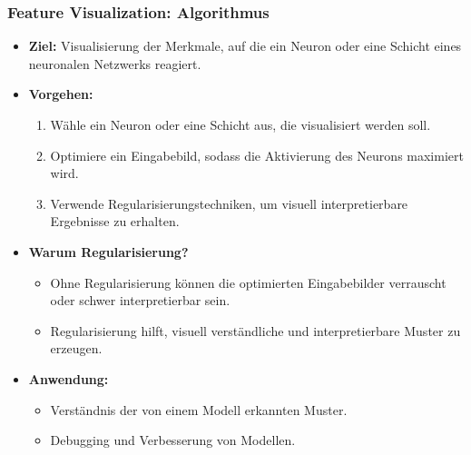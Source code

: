 \documentclass[aspectratio=1610, xcolor=dvipsnames, 9pt]{beamer}
\begin{document}
\begin{frame}
  \frametitle{Feature Visualization: Algorithmus}
  \begin{itemize}
    \item \textbf{Ziel:} Visualisierung der Merkmale, auf die ein Neuron oder eine Schicht eines neuronalen Netzwerks reagiert.
    \item \textbf{Vorgehen:}
    \begin{enumerate}
      \item Wähle ein Neuron oder eine Schicht aus, die visualisiert werden soll.
      \item Optimiere ein Eingabebild, sodass die Aktivierung des Neurons maximiert wird.
      \item Verwende Regularisierungstechniken, um visuell interpretierbare Ergebnisse zu erhalten.
    \end{enumerate}
    \item \textbf{Warum Regularisierung?}
    \begin{itemize}
      \item Ohne Regularisierung können die optimierten Eingabebilder verrauscht oder schwer interpretierbar sein.
      \item Regularisierung hilft, visuell verständliche und interpretierbare Muster zu erzeugen.
    \end{itemize}
    \item \textbf{Anwendung:} 
    \begin{itemize}
      \item Verständnis der von einem Modell erkannten Muster.
      \item Debugging und Verbesserung von Modellen.
    \end{itemize}
  \end{itemize}
\end{frame}
\end{document}
